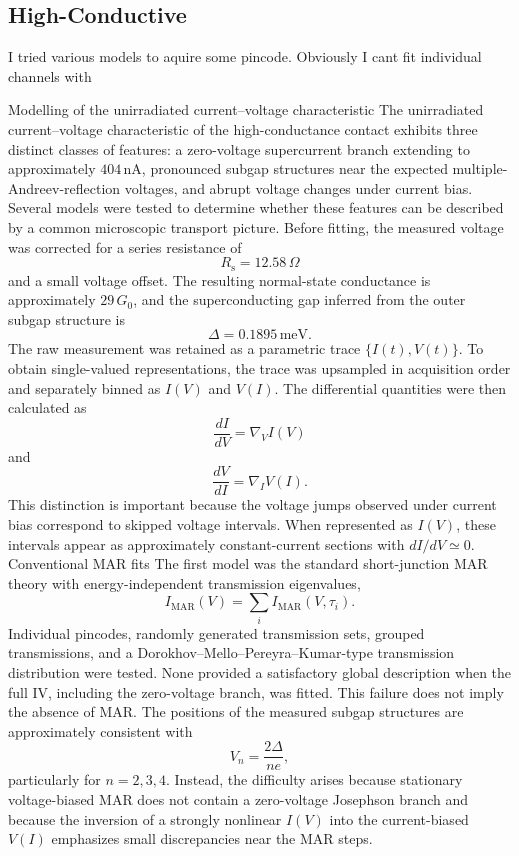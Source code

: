 
\subsection{High-Conductive}
\label{subsec:ac:low-transmission}

    I tried various models to aquire some pincode. Obviously I cant fit individual channels with 

    Modelling of the unirradiated current–voltage characteristic
The unirradiated current–voltage characteristic of the high-conductance contact exhibits three distinct classes of features: a zero-voltage supercurrent branch extending to approximately \(404\,\mathrm{nA}\), pronounced subgap structures near the expected multiple-Andreev-reflection voltages, and abrupt voltage changes under current bias. Several models were tested to determine whether these features can be described by a common microscopic transport picture.
Before fitting, the measured voltage was corrected for a series resistance of
\[
R_{\mathrm s}=12.58\,\Omega
\]and a small voltage offset. The resulting normal-state conductance is approximately \(29\,G_0\), and the superconducting gap inferred from the outer subgap structure is
\[
\Delta=0.1895\,\mathrm{meV}.
\]The raw measurement was retained as a parametric trace \(\{I(t),V(t)\}\). To obtain single-valued representations, the trace was upsampled in acquisition order and separately binned as \(I(V)\) and \(V(I)\). The differential quantities were then calculated as
\[
\frac{dI}{dV}=\nabla_V I(V)
\]and
\[
\frac{dV}{dI}=\nabla_I V(I).
\]This distinction is important because the voltage jumps observed under current bias correspond to skipped voltage intervals. When represented as \(I(V)\), these intervals appear as approximately constant-current sections with \(dI/dV\simeq0\).
Conventional MAR fits
The first model was the standard short-junction MAR theory with energy-independent transmission eigenvalues,
\[
I_{\mathrm{MAR}}(V)
=
\sum_i I_{\mathrm{MAR}}(V,\tau_i).
\]Individual pincodes, randomly generated transmission sets, grouped transmissions, and a Dorokhov–Mello–Pereyra–Kumar-type transmission distribution were tested. None provided a satisfactory global description when the full IV, including the zero-voltage branch, was fitted.
This failure does not imply the absence of MAR. The positions of the measured subgap structures are approximately consistent with
\[
V_n=\frac{2\Delta}{ne},
\]particularly for \(n=2,3,4\). Instead, the difficulty arises because stationary voltage-biased MAR does not contain a zero-voltage Josephson branch and because the inversion of a strongly nonlinear \(I(V)\) into the current-biased \(V(I)\) emphasizes small discrepancies near the MAR steps.
